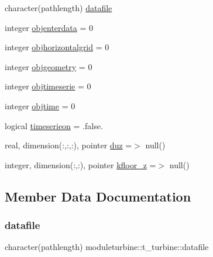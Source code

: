 \begin{DoxyCompactItemize}
character(pathlength) \mbox{\hyperlink{structmoduleturbine_1_1t__turbine_a98e69430bcdbe5d38fd091eec41a0fe0}{datafile}}
\item 
integer \mbox{\hyperlink{structmoduleturbine_1_1t__turbine_a91cd3ef600cda2c16347c430784b29c9}{objenterdata}} = 0
\item 
integer \mbox{\hyperlink{structmoduleturbine_1_1t__turbine_a259a49d5f8806b353137a3528c0951db}{objhorizontalgrid}} = 0
\item 
integer \mbox{\hyperlink{structmoduleturbine_1_1t__turbine_a1af08fb7ef39aa25ff83dd3e4d58a52b}{objgeometry}} = 0
\item 
integer \mbox{\hyperlink{structmoduleturbine_1_1t__turbine_a0a80b3cee6c1d15b4c87e76da2f0393b}{objtimeserie}} = 0
\item 
integer \mbox{\hyperlink{structmoduleturbine_1_1t__turbine_a8d35dd295c1f725a25834969c2cc407e}{objtime}} = 0
\item 
logical \mbox{\hyperlink{structmoduleturbine_1_1t__turbine_aef7161343b6308d9a7307c125417c499}{timeserieon}} = .false.
\item 
real, dimension(\+:,\+:,\+:), pointer \mbox{\hyperlink{structmoduleturbine_1_1t__turbine_a110d515d45e9e9d96187da8d9b73a43c}{duz}} =$>$ null()
\item 
integer, dimension(\+:,\+:), pointer \mbox{\hyperlink{structmoduleturbine_1_1t__turbine_a2fe567e8f083f6d03e856480cd47a2d5}{kfloor\+\_\+z}} =$>$ null()
\end{DoxyCompactItemize}


\subsection{Member Data Documentation}
\mbox{\label{structmoduleturbine_1_1t__turbine_a98e69430bcdbe5d38fd091eec41a0fe0}} 
\subsubsection{\texorpdfstring{datafile}{datafile}}
{\footnotesize\ttfamily character(pathlength) moduleturbine\+::t\+\_\+turbine\+::datafile\hspace{0.3cm}{\ttfamily [private]}}

\mbox{\label{structmoduleturbine_1_1t__turbine_a110d515d45e9e9d96187da8d9b73a43c}} 
